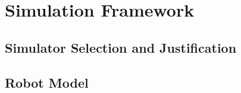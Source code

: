 
\chapter{Simulation Framework}



\lipsum[25]

\section{Simulator Selection and Justification}



\lipsum[26]

\begin{criticalinsight}
\end{criticalinsight}

\section{Robot Model}



